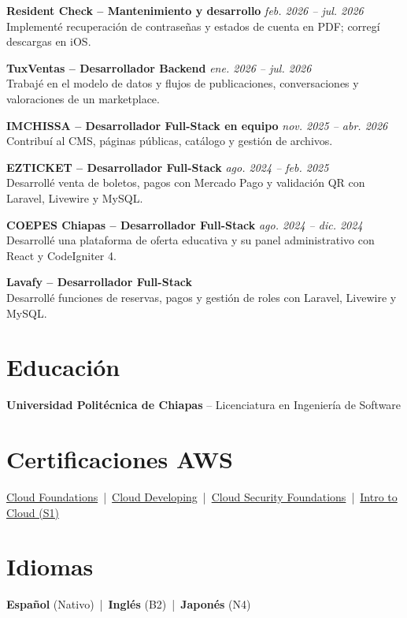 \textbf{Resident Check -- Mantenimiento y desarrollo} \hfill \textit{feb. 2026 -- jul. 2026}\\
Implement\'e recuperaci\'on de contrase\~nas y estados de cuenta en PDF; correg\'i descargas en iOS.

\textbf{TuxVentas -- Desarrollador Backend} \hfill \textit{ene. 2026 -- jul. 2026}\\
Trabaj\'e en el modelo de datos y flujos de publicaciones, conversaciones y valoraciones de un marketplace.

\textbf{IMCHISSA -- Desarrollador Full-Stack en equipo} \hfill \textit{nov. 2025 -- abr. 2026}\\
Contribu\'i al CMS, p\'aginas p\'ublicas, cat\'alogo y gesti\'on de archivos.

\textbf{EZTICKET -- Desarrollador Full-Stack} \hfill \textit{ago. 2024 -- feb. 2025}\\
Desarroll\'e venta de boletos, pagos con Mercado Pago y validaci\'on QR con Laravel, Livewire y MySQL.

\textbf{COEPES Chiapas -- Desarrollador Full-Stack} \hfill \textit{ago. 2024 -- dic. 2024}\\
Desarroll\'e una plataforma de oferta educativa y su panel administrativo con React y CodeIgniter 4.

\textbf{Lavafy -- Desarrollador Full-Stack}\\
Desarroll\'e funciones de reservas, pagos y gesti\'on de roles con Laravel, Livewire y MySQL.

\section{Educaci\'on}
\textbf{Universidad Polit\'ecnica de Chiapas} -- Licenciatura en Ingenier\'ia de Software

\section{Certificaciones AWS}
\href{https://www.credly.com/badges/17c50411-0cbe-4586-bd34-00c130c92e22/public_url}{\faCertificate\; Cloud Foundations} \,|\,
\href{https://www.credly.com/badges/920866d4-e314-469b-87d3-b4da8c069864/public_url}{\faCertificate\; Cloud Developing} \,|\,
\href{https://www.credly.com/badges/dbcfcfd3-7d99-4877-b777-1489e1edf8d5/public_url}{\faCertificate\; Cloud Security Foundations} \,|\,
\href{https://www.credly.com/badges/657cf76c-0b10-40ba-a55d-62f35c764ac2/public_url}{\faCertificate\; Intro to Cloud (S1)}

\section{Idiomas}
\textbf{Espa\~nol} (Nativo) \,|\, \textbf{Ingl\'es} (B2) \,|\, \textbf{Japon\'es} (N4)
